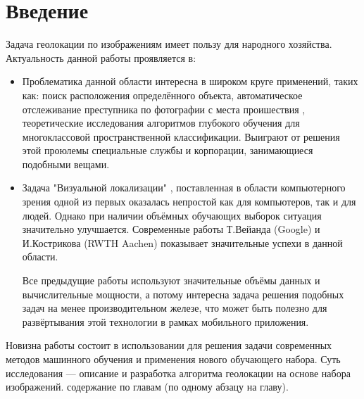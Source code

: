 \chapter*{Введение}
\label{sec:afterwords}

Задача геолокации по изображениям имеет пользу для народного хозяйства.
Актуальность данной работы проявляется в:
	\begin{itemize}
		\item Проблематика данной области интересна в широком круге применений, таких как: 
		поиск расположения определённого объекта, автоматическое отслеживание преступника по фотографии с места проишествия , теоретические исследования алгоритмов глубокого обучения для многоклассовой пространственной классификации. Выиграют от решения этой проюлемы специальные службы и корпорации, занимающиеся подобными вещами.
		\item Задача "Визуальной локализации" \cite{im2gps}, поставленная в области
		компьютерного зрения одной из первых оказалась непростой как для компьютеров,
		так и для людей. 
		Однако при наличии объёмных обучающих выборок ситуация значительно улучшается. Современные работы Т.Вейанда (Google) и И.Кострикова (RWTH Aachen) \cite{weyand2016planet} показывает значительные успехи в данной области.
		
		Все предыдущие работы используют значительные объёмы данных и вычислительные мощности, а потому интересна задача решения подобных задач на менее производительном железе, что может быть полезно для развёртывания этой  технологии в рамках мобильного приложения.
	\end{itemize}
	Новизна работы состоит в использовании для решения задачи современных методов машинного обучения и применения нового обучающего набора.
	Суть исследования --- описание и разработка алгоритма геолокации на основе набора изображений.
	содержание по главам (по одному абзацу на главу).

